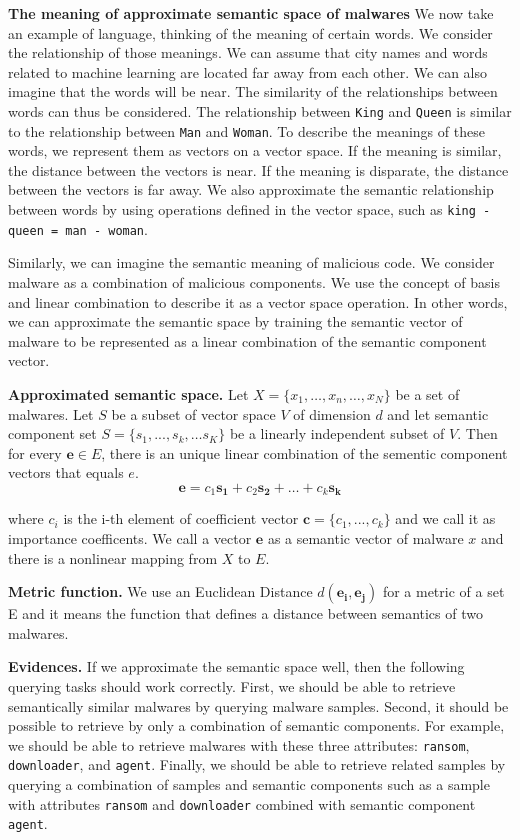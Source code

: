 \textbf{The meaning of approximate semantic space of malwares}
We now take an example of language, thinking of the meaning of certain words. We consider the relationship of those meanings. We can assume that city names and words related to machine learning are located far away from each other. We can also imagine that the words will be near. The similarity of the relationships between words can thus be considered. The relationship between \texttt{King} and \texttt{Queen} is similar to the relationship between \texttt{Man} and \texttt{Woman}. To describe the meanings of these words, we represent them as vectors on a vector space. If the meaning is similar, the distance between the vectors is near. If the meaning is disparate, the distance between the vectors is far away. We also approximate the semantic relationship between words by using operations defined in the vector space, such as \texttt{king - queen = man - woman}.

Similarly, we can imagine the semantic meaning of malicious code. We consider malware as a combination of malicious components. We use the concept of basis and linear combination to describe it as a vector space operation. In other words, we can approximate the semantic space by training the semantic vector of malware to be represented as a linear combination of the semantic component vector.


\textbf{Approximated semantic space. }
Let $X = \{x_1, …, x_n, …, x_N\}$ be a set of malwares.
Let $S$ be a subset of vector space $V$ of dimension $d$ and let semantic component set $S = \{s_1, ... , s_k, … s_K\}$ be a linearly independent subset of $V$.  
Then for every $\mathbf{e} \in E$, there is an unique linear combination of the sementic component vectors that equals $e$.
\[
\mathbf{e} = c_1\mathbf{s_1} + c_2\mathbf{s_2} + … + c_k\mathbf{s_k} 
\]

where $c_i$ is the i-th element of coefficient vector $ \mathbf{c} = \{c_1, ... , c_k\}$ and we call it as importance coefficents.
We call a vector $\mathbf{e}$ as a semantic vector of malware $x$ and there is a nonlinear mapping from $X$ to $E$. 

\textbf{Metric function. }
We use an Euclidean Distance $d(\mathbf{e_i}, \mathbf{e_j})$ for a metric of a set E and it means the function that defines a distance between  semantics of two malwares. 


\textbf{Evidences. } 
If we approximate the semantic space well, then the following querying tasks should work correctly. First, we should be able to retrieve semantically similar malwares by querying malware samples. Second, it should be possible to retrieve by only a combination of semantic components. For example, we should be able to retrieve malwares with these three attributes: \texttt{ransom}, \texttt{downloader}, and \texttt{agent}. Finally, we should be able to retrieve related samples by querying a combination of samples and semantic components such as a sample with attributes \texttt{ransom} and \texttt{downloader} combined with semantic component \texttt{agent}.


